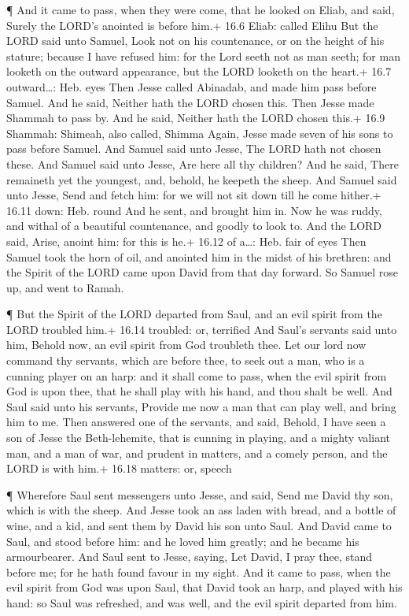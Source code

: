 ¶ And it came to pass, when they were come, that he looked
on Eliab, and said, Surely the LORD's anointed is before him.+ 16.6
Eliab: called Elihu  But the LORD said unto Samuel, Look not
on his countenance, or on the height of his stature; because I have
refused him: for the Lord seeth not as man seeth; for man looketh on the
outward appearance, but the LORD looketh on the heart.+ 16.7
outward\ldots: Heb. eyes  Then Jesse called Abinadab, and
made him pass before Samuel. And he said, Neither hath the LORD chosen
this.  Then Jesse made Shammah to pass by. And he said,
Neither hath the LORD chosen this.+ 16.9 Shammah: Shimeah, also called,
Shimma  Again, Jesse made seven of his sons to pass before
Samuel. And Samuel said unto Jesse, The LORD hath not chosen these.
 And Samuel said unto Jesse, Are here all thy children? And
he said, There remaineth yet the youngest, and, behold, he keepeth the
sheep. And Samuel said unto Jesse, Send and fetch him: for we will not
sit down till he come hither.+ 16.11 down: Heb. round  And
he sent, and brought him in. Now he was ruddy, and withal of a beautiful
countenance, and goodly to look to. And the LORD said, Arise, anoint
him: for this is he.+ 16.12 of a\ldots: Heb. fair of eyes 
Then Samuel took the horn of oil, and anointed him in the midst of his
brethren: and the Spirit of the LORD came upon David from that day
forward. So Samuel rose up, and went to Ramah.

 ¶ But the Spirit of the LORD departed from Saul, and an
evil spirit from the LORD troubled him.+ 16.14 troubled: or, terrified
 And Saul's servants said unto him, Behold now, an evil
spirit from God troubleth thee.  Let our lord now command
thy servants, which are before thee, to seek out a man, who is a cunning
player on an harp: and it shall come to pass, when the evil spirit from
God is upon thee, that he shall play with his hand, and thou shalt be
well.  And Saul said unto his servants, Provide me now a
man that can play well, and bring him to me.  Then answered
one of the servants, and said, Behold, I have seen a son of Jesse the
Beth-lehemite, that is cunning in playing, and a mighty valiant man, and
a man of war, and prudent in matters, and a comely person, and the LORD
is with him.+ 16.18 matters: or, speech

 ¶ Wherefore Saul sent messengers unto Jesse, and said,
Send me David thy son, which is with the sheep.  And Jesse
took an ass laden with bread, and a bottle of wine, and a kid, and sent
them by David his son unto Saul.  And David came to Saul,
and stood before him: and he loved him greatly; and he became his
armourbearer.  And Saul sent to Jesse, saying, Let David, I
pray thee, stand before me; for he hath found favour in my sight.
 And it came to pass, when the evil spirit from God was
upon Saul, that David took an harp, and played with his hand: so Saul
was refreshed, and was well, and the evil spirit departed from him.

